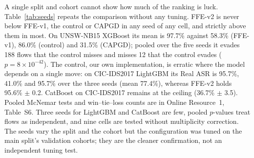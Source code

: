 A single split and cohort cannot show how much of the ranking is luck. Table~\ref{tab:seeds} repeats the comparison without any tuning. FFE-v2 is never below FFE-v1, the control or CAPGD in any seed of any cell, and strictly above them in most. On UNSW-NB15 XGBoost its mean is 97.7\% against 58.3\% (FFE-v1), 86.0\% (control) and 31.5\% (CAPGD); pooled over the five seeds it evades 188 flows that the control misses and misses 12 that the control evades ($p=8\times10^{-42}$). The control, our own implementation, is erratic where the model depends on a single move: on CIC-IDS2017 LightGBM its Real ASR is 95.7\%, 41.0\% and 95.7\% over the three seeds (mean 77.4\%), whereas FFE-v2 holds 95.6\% $\pm$ 0.2. CatBoost on CIC-IDS2017 remains at the ceiling (36.7\% $\pm$ 3.5). Pooled McNemar tests and win--tie--loss counts are in Online Resource~1, Table~S6. Three seeds for LightGBM and CatBoost are few, pooled $p$-values treat flows as independent, and nine cells are tested without multiplicity correction. The seeds vary the split and the cohort but the configuration was tuned on the main split's validation cohorts; they are the cleaner confirmation, not an independent tuning test.
